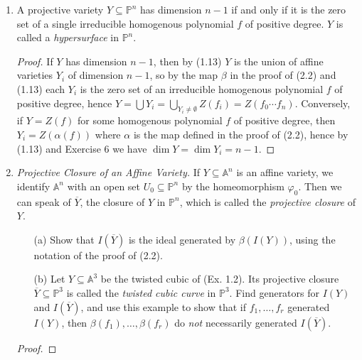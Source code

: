 \documentclass[12pt]{article}
\newcommand{\A}{\mathbb{A}}
\newcommand{\PP}{\mathbb{P}}
\theoremstyle{definition}
\begin{document}
\begin{enumerate} [label=\textbf{\arabic*.}, leftmargin=-0.05em]
\item A projective variety $Y \subseteq \PP^n$ has dimension $n - 1$ if and only if it is the zero set of a single irreducible homogenous polynomial $f$ of positive degree. $Y$ is called a \textit{hypersurface} in $\PP^n$.

\begin{proof}
    If $Y$ has dimension $n - 1$, then by (1.13) $Y$ is the union of affine varieties $Y_i$ of dimension $n - 1$, so by the map $\beta$ in the proof of (2.2) and (1.13) each $Y_i$ is the zero set of an irreducible homogenous polynomial $f$ of positive degree, hence $Y = \bigcup Y_i = \bigcup_{Y_i \neq \emptyset} Z(f_i) = Z(f_0 \cdots f_n)$. Conversely, if $Y = Z(f)$ for some homogenous polynomial $f$ of positive degree, then $Y_i = Z(\alpha(f))$ where $\alpha$ is the map defined in the proof of (2.2), hence by (1.13) and Exercise 6 we have $\dim{Y} = \dim{Y_i} = n - 1$.
\end{proof}

\item \textit{Projective Closure of an Affine Variety.} If $Y \subseteq \A^n$ is an affine variety, we identify $\A^n$ with an open set $U_0 \subseteq \PP^n$ by the homeomorphism $\varphi_0$. Then we can speak of $\overline{Y}$, the closure of $Y$ in $\PP^n$, which is called the \textit{projective closure} of $Y$.
\begin{itemize}
    \item[(a)] Show that $I(\overline{Y})$ is the ideal generated by $\beta(I(Y))$, using the notation of the proof of (2.2).
    \item[(b)] Let $Y \subseteq \A^3$ be the twisted cubic of (Ex. 1.2). Its projective closure $\overline{Y} \subseteq \PP^3$ is called the \textit{twisted cubic curve} in $\PP^3$. Find generators for $I(Y)$ and $I(\overline{Y})$, and use this example to show that if $f_1, \dots, f_r$ generated $I(Y)$, then $\beta(f_1), \dots, \beta(f_r)$ do \textit{not} necessarily generated $I(\overline{Y})$.
\end{itemize}

\begin{proof}
    
\end{proof}


\end{enumerate}
\end{document}
